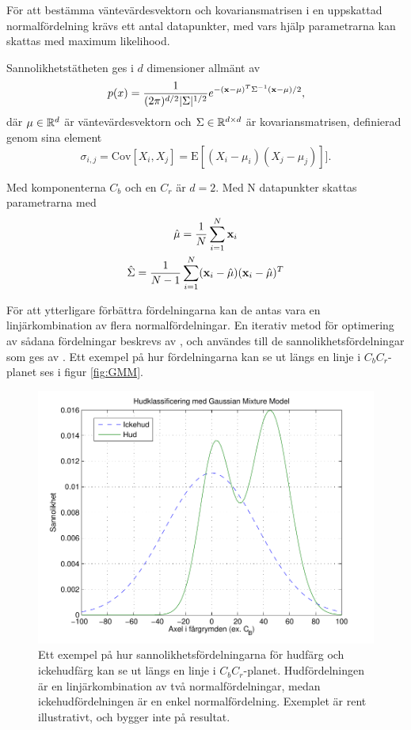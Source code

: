 \documentclass[../rapport_MVEX01-11-05]{subfiles}
\begin{document}
För att bestämma väntevärdesvektorn och kovariansmatrisen i en
uppskattad normalfördelning krävs ett
antal datapunkter, med vars hjälp parametrarna kan skattas med maximum
likelihood.

Sannolikhetstätheten ges i $d$ dimensioner allmänt av
\begin{equation*}
  p(x)=\frac{1}{(2\pi)^{d/2}|\Sigma|^{1/2}}e^{-(\mathbf{x}-\mu)^T\Sigma^{-1}(\mathbf{x}-\mu)/2},
\end{equation*}
där $\mu\in\mathbb{R}^d$ är väntevärdesvektorn och
$\Sigma\in\mathbb{R}^{d\times d}$ är kovariansmatrisen, definierad
genom sina element
\begin{equation*}
 \sigma_{i,j}=\text{Cov}[X_i,X_j]=\text{E}[(X_i-\mu_i)(X_j-\mu_j)]].
\end{equation*}

Med komponenterna $C_b$ och en $C_r$ är $d=2$.
Med N datapunkter skattas parametrarna med
\begin{gather*}
  \hat\mu    =\frac{1}{N}\sum_{i=1}^N\mathbf{x}_i\\
  \hat\Sigma =\frac{1}{N-1}\sum_{i=1}^N(\mathbf{x}_i-\hat\mu)(\mathbf{x}_i-\hat\mu)^T
\end{gather*}

För att ytterligare förbättra fördelningarna kan de antas vara
en linjärkombination av flera normalfördelningar. En iterativ metod för optimering av
sådana fördelningar beskrevs av , och användes
till de sannolikhetsfördelningar som ges av . 
Ett exempel på hur fördelningarna kan se ut längs en linje i
$C_bC_r$-planet ses i figur \vref{fig:GMM}.

\begin{figure}[tbp]
    \begin{center}
        \includegraphics[width=1\columnwidth]{bilder/gmm}
    \end{center}
    \caption{Ett exempel på hur sannolikhetsfördelningarna för hudfärg och
    ickehudfärg kan se ut längs en linje i $C_bC_r$-planet.
    Hudfördelningen är en linjärkombination av två normalfördelningar, medan
    ickehudfördelningen är en enkel normalfördelning. Exemplet är rent
    illustrativt, och bygger inte på resultat.}
    \label{fig:GMM}
\end{figure}
\end{document}
